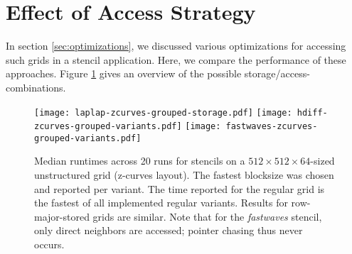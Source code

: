 \section{Effect of Access Strategy} \label{sec:res-access}

In section \ref{sec:optimizations}, we discussed various optimizations for accessing such grids in a stencil application. Here, we compare the performance of these approaches. Figure \ref{fig:storage-access} gives an overview of the possible storage/access-combinations.

\begin{figure}
	\texttt{[image: laplap-zcurves-grouped-storage.pdf]} %
	\texttt{[image: hdiff-zcurves-grouped-variants.pdf]} %
	\texttt{[image: fastwaves-zcurves-grouped-variants.pdf]} %
	\caption{\label{fig:storage-access} Median runtimes across 20 runs for stencils on a $512\times512\times 64$-sized unstructured grid (z-curves layout). The fastest blocksize was chosen and reported per variant. The time reported for the regular grid is the fastest of all implemented regular variants. Results for row-major-stored grids are similar. Note that for the \emph{fastwaves} stencil, only direct neighbors are accessed; pointer chasing thus never occurs.}
\end{figure}

